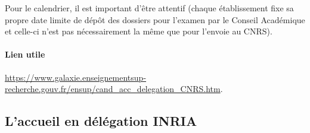 Pour le calendrier, il est important d'être attentif (chaque \'etablissement fixe sa propre
date limite de d\'ep\^ot des dossiers pour l'examen par le Conseil
Acad\'emique et celle-ci n'est pas nécessairement la même que pour l'envoie au CNRS). 

\vspace{-.5\baselineskip}
\paragraph*{Lien utile}\url{https://www.galaxie.enseignementsup-recherche.gouv.fr/ensup/cand_acc_delegation_CNRS.htm}.
% 
%
%
%
\subsection*{L'accueil en d\'el\'egation INRIA}

